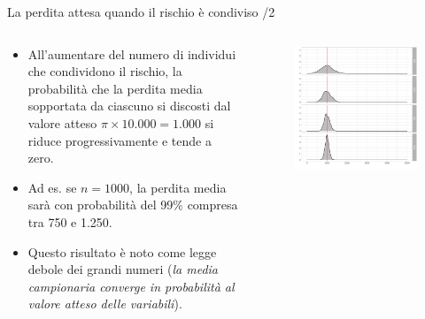 \documentclass[aspectratio=64,11pt]{beamer}
\begin{document}
\begin{frame}{La perdita attesa quando il rischio è condiviso /2}
\begin{columns}
\begin{column}{.4\columnwidth}
\small
\begin{itemize}
\item All'aumentare del numero di individui che
condividono il rischio, la probabilità che la perdita media sopportata da
ciascuno si discosti dal valore atteso \(\pi \times 10.000 = 1.000\) si
riduce progressivamente e tende a zero.
\item Ad es. se \(n=1000\), la perdita media sarà con probabilità del 99\% compresa
tra 750 e 1.250.
\item Questo risultato è noto come \alert{legge debole dei grandi numeri} (\emph{la media
campionaria converge in probabilità al valore atteso delle variabili}).
\end{itemize}
\end{column}
\begin{column}{.6\columnwidth}
\begin{figure}[htbp]
\centering
\includegraphics[width=\textwidth]{./figure/distribuzione-perdite-2.pdf}
\end{figure}
\end{column}
\end{columns}
\end{frame}
\end{document}
